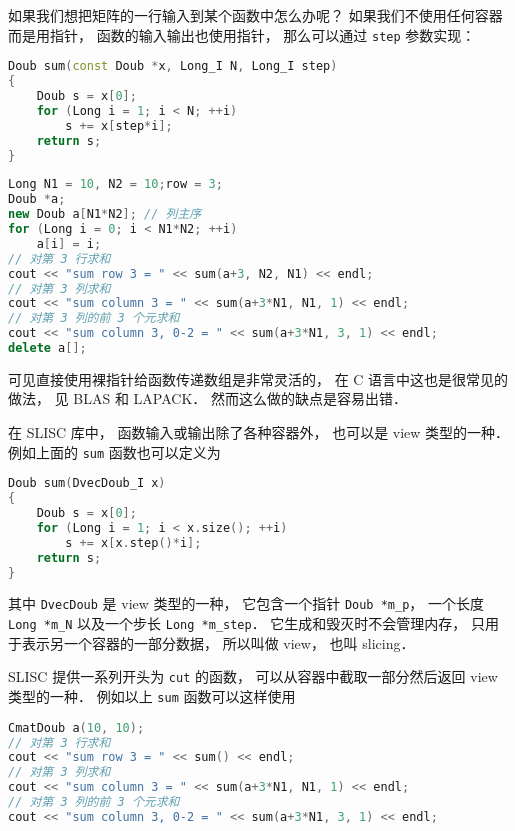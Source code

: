 

如果我们想把矩阵的一行输入到某个函数中怎么办呢？ 如果我们不使用任何容器而是用指针， 函数的输入输出也使用指针， 那么可以通过 \verb|step| 参数实现：
\begin{lstlisting}[language=cpp]
Doub sum(const Doub *x, Long_I N, Long_I step)
{
    Doub s = x[0];
    for (Long i = 1; i < N; ++i)
        s += x[step*i];
    return s;
}
\end{lstlisting}

\begin{lstlisting}[language=cpp]
Long N1 = 10, N2 = 10;row = 3;
Doub *a;
new Doub a[N1*N2]; // 列主序
for (Long i = 0; i < N1*N2; ++i)
    a[i] = i;
// 对第 3 行求和
cout << "sum row 3 = " << sum(a+3, N2, N1) << endl;
// 对第 3 列求和
cout << "sum column 3 = " << sum(a+3*N1, N1, 1) << endl;
// 对第 3 列的前 3 个元求和
cout << "sum column 3, 0-2 = " << sum(a+3*N1, 3, 1) << endl;
delete a[];
\end{lstlisting}

可见直接使用裸指针给函数传递数组是非常灵活的， 在 C 语言中这也是很常见的做法， 见 BLAS 和 LAPACK． 然而这么做的缺点是容易出错．

在 SLISC 库中， 函数输入或输出除了各种容器外， 也可以是 view 类型的一种． 例如上面的 \verb|sum| 函数也可以定义为
\begin{lstlisting}[language=cpp]
Doub sum(DvecDoub_I x)
{
    Doub s = x[0];
    for (Long i = 1; i < x.size(); ++i)
        s += x[x.step()*i];
    return s;
}
\end{lstlisting}
其中 \verb|DvecDoub| 是 view 类型的一种， 它包含一个指针 \verb|Doub *m_p|， 一个长度 \verb|Long *m_N| 以及一个步长 \verb|Long *m_step|． 它生成和毁灭时不会管理内存， 只用于表示另一个容器的一部分数据， 所以叫做 view， 也叫 slicing．

SLISC 提供一系列开头为 \verb|cut| 的函数， 可以从容器中截取一部分然后返回 view 类型的一种． 例如以上 \verb|sum| 函数可以这样使用
\begin{lstlisting}[language=cpp]
CmatDoub a(10, 10);
// 对第 3 行求和
cout << "sum row 3 = " << sum() << endl;
// 对第 3 列求和
cout << "sum column 3 = " << sum(a+3*N1, N1, 1) << endl;
// 对第 3 列的前 3 个元求和
cout << "sum column 3, 0-2 = " << sum(a+3*N1, 3, 1) << endl;
\end{lstlisting}
